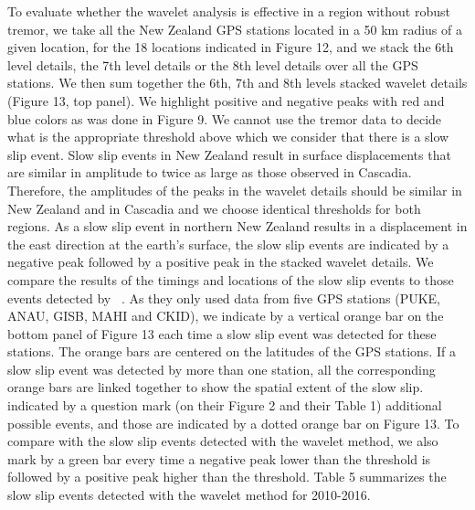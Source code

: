 \documentclass{article}
\begin{document}
To evaluate whether the wavelet analysis is effective in a region without robust tremor, we take all the New Zealand GPS stations located in a 50 km radius of a given location, for the 18 locations indicated in Figure 12, and we stack the 6th level details, the 7th level details or the 8th level details over all the GPS stations. We then sum together the 6th, 7th and 8th levels stacked wavelet details (Figure 13, top panel). We highlight positive and negative peaks with red and blue colors as was done in Figure 9. We cannot use the tremor data to decide what is the appropriate threshold above which we consider that there is a slow slip event. Slow slip events in New Zealand result in surface displacements that are similar in amplitude to twice as large as those observed in Cascadia. Therefore, the amplitudes of the peaks in the wavelet details should be similar in New Zealand and in Cascadia and we choose identical thresholds for both regions. As a slow slip event in northern New Zealand results in a displacement in the east direction at the earth’s surface, the slow slip events are indicated by a negative peak followed by a positive peak in the stacked wavelet details. We compare the results of the timings and locations of the slow slip events to those events detected by ~\citet{TOD_2016}. As they only used data from five GPS stations (PUKE, ANAU, GISB, MAHI and CKID), we indicate by a vertical orange bar on the bottom panel of Figure 13 each time a slow slip event was detected for these stations. The orange bars are centered on the latitudes of the GPS stations. If a slow slip event was detected by more than one station, all the corresponding orange bars are linked together to show the spatial extent of the slow slip. ~\citet{TOD_2016} indicated by a question mark (on their Figure 2 and their Table 1) additional possible events, and those are indicated by a dotted orange bar on Figure 13. To compare with the slow slip events detected with the wavelet method, we also mark by a green bar every time a negative peak lower than the threshold is followed by a positive peak higher than the threshold. Table 5 summarizes the slow slip events detected with the wavelet method for 2010-2016. \\
\end{document}
